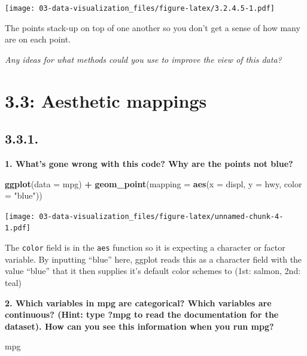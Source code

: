 \documentclass[]{book}
\newenvironment{Shaded}{\begin{snugshade}}{\end{snugshade}}
\newcommand{\DataTypeTok}[1]{\textcolor[rgb]{0.13,0.29,0.53}{#1}}
\newcommand{\KeywordTok}[1]{\textcolor[rgb]{0.13,0.29,0.53}{\textbf{#1}}}
\newcommand{\NormalTok}[1]{#1}
\newcommand{\OperatorTok}[1]{\textcolor[rgb]{0.81,0.36,0.00}{\textbf{#1}}}
\newcommand{\StringTok}[1]{\textcolor[rgb]{0.31,0.60,0.02}{#1}}
\theoremstyle{definition}
\theoremstyle{definition}
\theoremstyle{definition}
\theoremstyle{remark}
\begin{document}
\texttt{[image: 03-data-visualization\_files/figure-latex/3.2.4.5-1.pdf]}

The points stack-up on top of one another so you don't get a sense of
how many are on each point.

\emph{Any ideas for what methods could you use to improve the view of
this data?}

\hypertarget{aesthetic-mappings}{%
\section{3.3: Aesthetic mappings}\label{aesthetic-mappings}}

\hypertarget{section-1}{%
\subsection{3.3.1.}\label{section-1}}

\textbf{1. What's gone wrong with this code? Why are the points not
blue?}

\begin{Shaded}
\begin{Highlighting}[]
\KeywordTok{ggplot}\NormalTok{(}\DataTypeTok{data =}\NormalTok{ mpg) }\OperatorTok{+}\StringTok{ }
\StringTok{  }\KeywordTok{geom_point}\NormalTok{(}\DataTypeTok{mapping =} \KeywordTok{aes}\NormalTok{(}\DataTypeTok{x =}\NormalTok{ displ, }\DataTypeTok{y =}\NormalTok{ hwy, }\DataTypeTok{color =} \StringTok{"blue"}\NormalTok{))}
\end{Highlighting}
\end{Shaded}

\texttt{[image: 03-data-visualization\_files/figure-latex/unnamed-chunk-4-1.pdf]}

The \texttt{color} field is in the \texttt{aes} function so it is
expecting a character or factor variable. By inputting ``blue'' here,
ggplot reads this as a character field with the value ``blue'' that it
then supplies it's default color schemes to (1st: salmon, 2nd: teal)

\textbf{2. Which variables in mpg are categorical? Which variables are
continuous? (Hint: type ?mpg to read the documentation for the dataset).
How can you see this information when you run mpg?}

\begin{Shaded}
\begin{Highlighting}[]
\NormalTok{mpg}
\end{Highlighting}
\end{Shaded}
\end{document}
